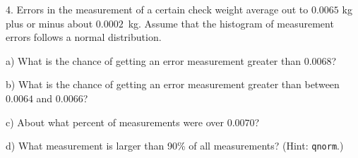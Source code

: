 \documentclass[10pt]{article}
\begin{document}
4. Errors in the measurement of a certain check weight average out to $0.0065$ kg plus or minus
about $0.0002$~kg.  Assume that the histogram of measurement errors follows a normal 
distribution.

\hspace{10pt} a) What is the chance of getting an error measurement greater than 
$0.0068$?
\vspace{.8in}

\hspace{10pt} b) What is the chance of getting an error measurement greater than 
between $0.0064$ and $0.0066$?
\vspace{.8in}

\hspace{10pt} c) About what percent of measurements  were over $0.0070$?
\vspace{.8in}

\hspace{10pt} d) What measurement is larger than 90\% of all measurements? (Hint:  \texttt{qnorm}.)
\vfill
\eject
\end{document}
